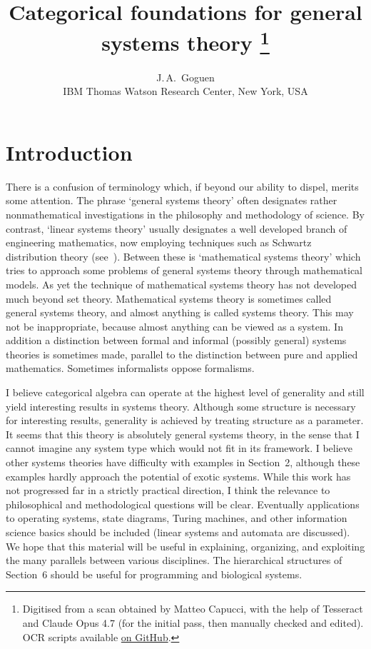 \documentclass[10pt,a4paper,twocolumn]{article}
\title{Categorical foundations for general systems theory%
  \thanks{Digitised from a scan obtained by Matteo Capucci, with the help of Tesseract and Claude Opus 4.7 (for the initial pass, then manually checked and edited). OCR scripts available \href{https://github.com/mattecapu/goguen-categorical-foundations}{on GitHub}.}}
\author{J.\,A.~Goguen\\
        \small IBM Thomas Watson Research Center, New York, USA}
\date{}
\newcommand{\origpage}[1]{%
  \marginpar{\raggedright\footnotesize\itshape p.~#1}%
}
\begin{document}
\maketitle


\section{Introduction}

\origpage{121}%
There is a confusion of terminology which, if beyond our ability to dispel, merits some attention.
The phrase `general systems theory' often designates rather nonmathematical investigations in the philosophy and methodology of science.
By contrast, `linear systems theory' usually designates a well developed branch of engineering mathematics, now employing techniques such as Schwartz distribution theory (see~\cite{ZadehDesoer}). Between these is `mathematical systems theory' which tries to approach some problems of general systems theory through mathematical models.
As yet the technique of mathematical systems theory has not developed much beyond set theory. Mathematical systems theory is sometimes called general systems theory, and almost anything is called systems theory.
This may not be inappropriate, because almost anything can be viewed as a system.
In addition a distinction between formal and informal (possibly general) systems theories is sometimes made, parallel to the distinction between pure and applied mathematics.
Sometimes informalists oppose formalisms.

I believe categorical algebra can operate at the highest level of generality and still yield interesting results in systems theory.
Although some structure is necessary for interesting results, generality is achieved by treating structure as a parameter.
It seems that this theory is absolutely general systems theory, in the sense that I cannot imagine any system type which would not fit in its framework.
I believe other systems theories have difficulty with examples in Section~2, although these examples hardly
approach the potential of exotic systems.
While this work has not progressed far in a strictly practical direction, I think the relevance to philosophical and methodological questions will be clear.
Eventually applications to operating systems, state diagrams, Turing machines, and other information science basics should be included (linear systems and automata are discussed).
We hope that this material will be useful in explaining, organizing, and exploiting the many parallels between various disciplines.
The hierarchical structures of Section~6 should be useful for programming and biological systems.
\end{document}
